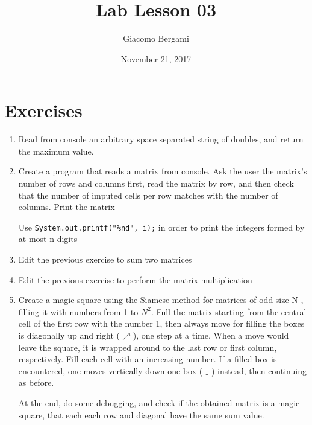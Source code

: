 \documentclass[]{scrartcl}
\title{Lab Lesson 03}
\date{November 21, 2017}
\author{Giacomo Bergami}
\begin{document}
\maketitle
\section*{Exercises}
\begin{enumerate}
\item Read from console an arbitrary space separated string of doubles, and return the maximum value.
\item Create a program that reads a matrix from console.
Ask the user the matrix's number of rows and columns first, read the matrix by row, and then check that the number of imputed cells per row matches with the number of columns.
Print the matrix

Use \texttt{System.out.printf("\%nd", i);} in order to print the integers formed by at most n digits
\item Edit the previous exercise to sum two matrices
\item Edit the previous exercise to perform the matrix multiplication
\item Create a magic square using the Siamese method for matrices of odd size N , filling it with numbers from 1 to $N^2$.
Full the matrix starting from the central cell of the first row with the number 1,
then always move for filling the boxes is diagonally up and right ($\nearrow$), one step at a time. When a move
 would leave the square, it is wrapped around to the last row or first column, respectively. Fill each cell with an
 increasing number. If a filled box is encountered, one moves vertically down one box ($\downarrow$) instead, then continuing
 as before.

 At the end, do some debugging, and check if the obtained matrix is a magic square, that each each row and diagonal
 have the same sum value.
\end{enumerate}
\end{document}
